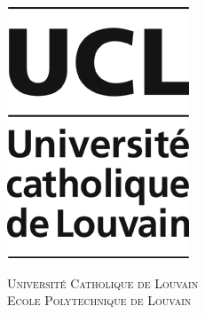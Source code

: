 \begin{titlepage}
\begin{center}
 
\begin{minipage}{0.20\textwidth}
\includegraphics[width=\textwidth]{img/ucl-official}
\end{minipage}
\begin{minipage}{0.58\textwidth}
\begin{center}
\textsc{\Large Université Catholique de Louvain}\\
\textsc{\Large Ecole Polytechnique de Louvain}\\
\end{center}
\end{minipage}
\begin{minipage}{0.20\textwidth}

\end{minipage}
\end{center}
\end{titlepage}
